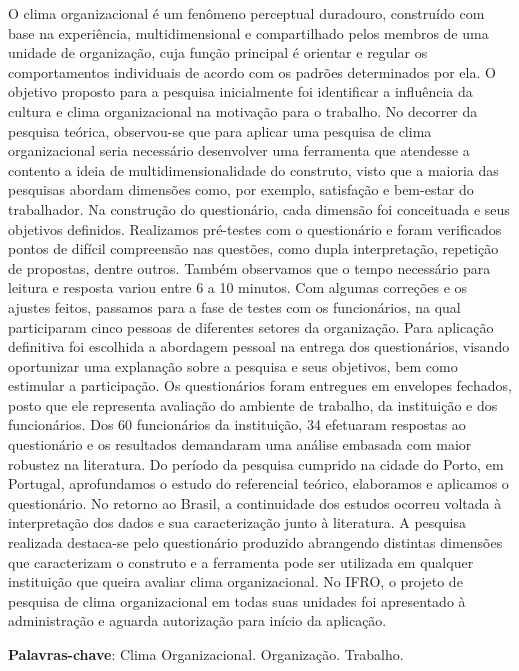 \documentclass[article,12pt,onesidea,4paper,english,brazil]{abntex2}
\begin{document}
	\noindent O clima organizacional é um fenômeno perceptual duradouro, construído com base na experiência, multidimensional e compartilhado pelos membros de uma unidade de organização, cuja função principal é orientar e regular os comportamentos individuais de acordo com os padrões determinados por ela. O objetivo proposto para a pesquisa inicialmente foi identificar a influência da cultura e clima organizacional na motivação para o trabalho. No decorrer da pesquisa teórica, observou-se que para aplicar uma pesquisa de clima organizacional seria necessário desenvolver uma ferramenta que atendesse a contento a ideia de multidimensionalidade do construto, visto que a maioria das pesquisas abordam dimensões como, por exemplo, satisfação e bem-estar do trabalhador. Na construção do questionário, cada dimensão foi conceituada e seus objetivos definidos. Realizamos pré-testes com o questionário e foram verificados pontos de difícil compreensão nas questões, como dupla interpretação, repetição de propostas, dentre outros. Também observamos que o tempo necessário para leitura e resposta variou entre 6 a 10 minutos. Com algumas correções e os ajustes feitos, passamos para a fase de testes com os funcionários, na qual participaram cinco pessoas de diferentes setores da organização. Para aplicação definitiva foi escolhida a abordagem pessoal na entrega dos questionários, visando oportunizar uma explanação sobre a pesquisa e seus objetivos, bem como estimular a participação. Os questionários foram entregues em envelopes fechados, posto que ele representa avaliação do ambiente de trabalho, da instituição e dos funcionários. Dos 60 funcionários da instituição, 34 efetuaram respostas ao questionário e os resultados demandaram uma análise embasada com maior robustez na literatura. Do período da pesquisa cumprido na cidade do Porto, em Portugal, aprofundamos o estudo do referencial teórico, elaboramos e aplicamos o questionário. No retorno ao Brasil, a continuidade dos estudos ocorreu voltada à interpretação dos dados e sua caracterização junto à literatura. A pesquisa realizada destaca-se pelo questionário produzido abrangendo distintas dimensões que caracterizam o construto e a ferramenta pode ser utilizada em qualquer instituição que queira avaliar clima organizacional. No IFRO, o projeto de pesquisa de clima organizacional em todas suas unidades foi apresentado à administração e aguarda autorização para início da aplicação.
	
	\vspace{\onelineskip}
	
	\noindent
	\textbf{Palavras-chave}: Clima Organizacional. Organização. Trabalho.
	
\end{document}
